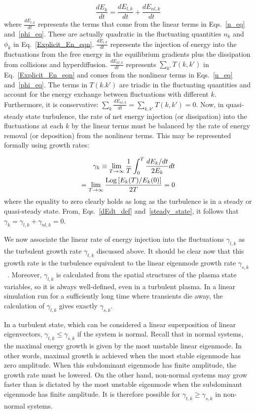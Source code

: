 \documentclass[letter,scriptaddress,twocolumn, prl,showkeys]{revtex4}
\def\beq{\begin{equation}}
\def\eeq{\end{equation}}
\def\beqar{\begin{eqnarray}}
\def\eeqar{\end{eqnarray}}
\newcommand{\diff}[2]{\frac{d#1}{d#2}}
\begin{document}
\beq
\label{dEdt_def}
\diff{E_k}{t} = \diff{E_{l,k}}{t} + \diff{E_{nl,k}}{t}
\eeq
where $\diff{E_{l,k}}{t}$ represents the terms that come from the linear terms in Eqs.~\ref{n_eq} and~\ref{phi_eq}. These are actually quadratic in the fluctuating
quantities $n_k$ and $\phi_k$ in Eq.~\ref{Explicit_En_eqn}. 
$\diff{E_{l,k}}{t}$ represents the injection of energy into the fluctuations from the free energy in the equilibrium gradients plus the dissipation from collisions and hyperdiffusion.
$\diff{E_{nl,k}}{t}$ represents $\sum_{k'} T(k,k')$ in  Eq.~\ref{Explicit_En_eqn} and comes from the nonlinear terms in 
Eqs.~\ref{n_eq} and~\ref{phi_eq}. The terms in $T(k.k')$ are triadic in the fluctuating quantities and
account for the energy exchange between fluctuations with different $k$. Furthermore, it is conservative: $\sum_{k} \diff{E_{nl,k}}{t} = \sum_{k,k'} T(k,k') = 0$.
Now, in quasi-steady state turbulence, the rate of net energy injection (or dissipation) into the fluctuations at each $k$ by the linear terms must be balanced by
the rate of energy removal (or deposition) from the nonlinear terms. This may be represented formally using growth rates:

\beqar
\label{steady_state}
\gamma_k \equiv  \displaystyle\lim_{T \to \infty} \frac{1}{T} \int_0^T \frac{dE_k/dt}{2 E_k} dt \nonumber \\
= \displaystyle\lim_{T \to \infty} \frac{{\rm{Log}}\left[ E_k(T)/E_k(0) \right]}{2 T} = 0
\eeqar
where the equality to zero clearly holds as long as the turbulence is in a steady or quasi-steady state.
From, Eqs.~\ref{dEdt_def} and~\ref{steady_state}, it follows that $ \gamma_k = \gamma_{l,k} + \gamma_{nl,k} = 0$.

We now associate the linear rate of energy injection into the fluctuations $\gamma_{l,k}$ as the turbulent growth rate $\gamma_{t,k}$ discussed above. 
It should be clear now that this growth rate is the turbulence equivalent to the linear eigenmode growth rate $\gamma_{s,k}$~\cite{friedman2012b,terry2006b}. 
Moreover, $\gamma_{l,k}$ is calculated from the spatial structures of the plasma state variables, so it is always well-defined, even in a turbulent plasma. In a linear simulation run for a
sufficiently long time where transients die away, the calculation of $\gamma_{l,k}$ gives exactly $\gamma_{s,k}$.

In a turbulent state, which can be considered a linear superposition of linear eigenvectors, $\gamma_{t,k} \le \gamma_{s,k}$ if the system is normal. Recall that in normal systems, the maximal
energy growth is given by the most unstable linear eigenmode. In other words, maximal growth is achieved when the most stable eigenmode has zero amplitude. When this subdominant eigenmode has finite
amplitude, the growth rate must be lowered. On the other hand, non-normal systems may grow faster than is dictated by the most unstable eigenmode when the subdominant eigenmode has finite amplitude. 
It is therefore possible for $\gamma_{t,k} \ge \gamma_{s,k}$ in non-normal systems. 
\end{document}
